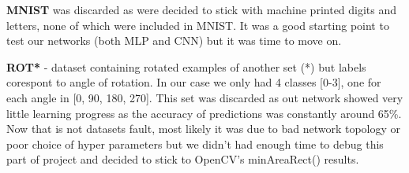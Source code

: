 \documentclass[Report.tex]{subfiles}
\begin{document}
\begin{flushleft}
\textbf{MNIST} was discarded as were decided to stick with machine printed digits and letters, none of which were included in MNIST. It was a good starting point to test our networks (both MLP and CNN) but it was time to move on.


\par
\textbf{ROT*} - dataset containing rotated examples of another set (*) but labels corespont to angle of rotation. In our case we only had 4 classes [0-3], one for each angle in [0, 90, 180, 270].
This set was discarded as out network showed very little learning progress as the accuracy of predictions was constantly around 65\%. Now that is not datasets fault, most likely it was due to bad network topology or poor choice of hyper parameters but we didn't had enough time to debug this part of project and decided to stick to OpenCV's minAreaRect() results.
\end{flushleft}
\end{document}

